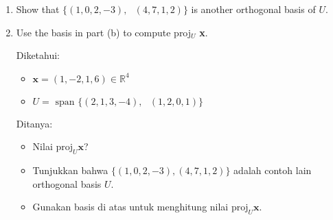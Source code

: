 \documentclass[12pt, a4paper]{scrartcl}
\begin{document}
\begin{enumerate}
\begin{enumerate}
                \item Show that $\{(1, 0, 2, -3), \mbox{ }(4, 7, 1, 2)\}$ is another orthogonal basis of $U$.
                
                \item Use the basis in part (b) to compute proj$_U$ \textbf{x}.
                
                Diketahui:
                \begin{itemize}
                    \item[] $\textbf{x}=(1, -2, 1, 6) \in \mathbb{R}^4$
                    \item[] $U = \mbox{ span } \{(2, 1, 3, -4), \mbox{ }(1, 2, 0, 1)\}$
                \end{itemize}

                Ditanya:
                \begin{itemize}
                    \item Nilai $\mbox{proj}_U \textbf{x}$?
                    \item Tunjukkan bahwa $\{(1,0,2,-3), (4,7,1,2)\}$ adalah contoh lain orthogonal basis $U$.
                    \item Gunakan basis di atas untuk menghitung nilai $\mbox{proj}_U \textbf{x}$. 
                \end{itemize}
            

\end{enumerate}
\end{enumerate}
\end{document}
